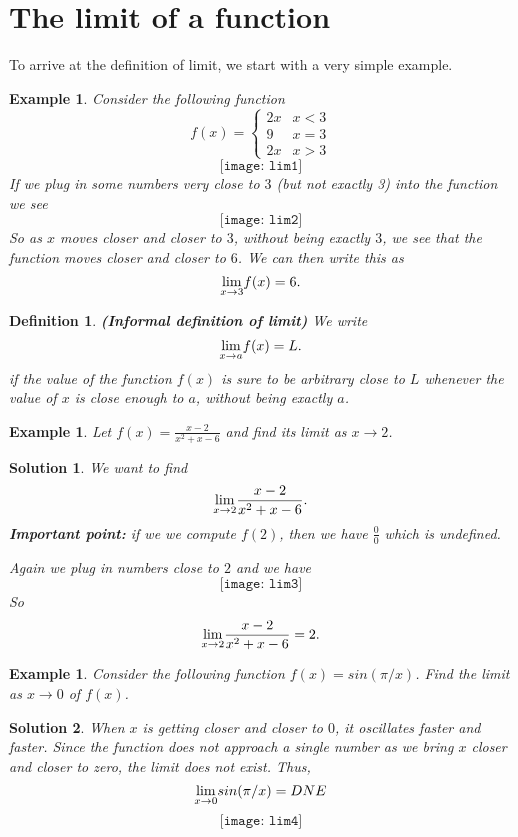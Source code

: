 \documentclass[12pt,a4paper]{book}
\newtheorem{Example}[theorem]{Example}
\numberwithin{equation}{section}
\newtheorem*{definition}{Definition}
\newtheorem*{solution}{{\bf Solution}}
\begin{document}
\newpage 
\section{The limit of a function}

To arrive at the definition of limit, we start with a very simple example.
\begin{Example}
	Consider the following function
	$$
	f(x)=\begin{cases}
	2x & x<3\\
	9 & x=3\\
	2x & x>3
	\end{cases}
	$$
	$$
	\texttt{[image: lim1]}
	$$
	If we plug in some numbers very close to $3$ (but not exactly 3) into the function we see
		$$
	\texttt{[image: lim2]}
	$$
	So as $x$ moves closer and closer to $3$, without being exactly $3$, we see that the function moves closer and closer to $6$. We can then write this as 
	$$\underset{x\rightarrow 3}{\rm lim}f(x)=6.$$ \end{Example}
	\begin{mdframed}
	\begin{definition}
		{\bf (Informal definition of limit)} We write 
		$$\underset{x\rightarrow a}{\rm lim}f(x)=L.$$
		if the value of the function $f(x)$ is sure to be arbitrary close to $L$ whenever the value of $x$ is close enough to $a$, without being exactly $a$.
	\end{definition}
	\end{mdframed}

\begin{Example}
	Let $f(x)=\frac{x-2}{x^2+x-6}$ and find its limit as $x\rightarrow 2$.  
\end{Example}
\begin{solution}
	We want to find
		$$\underset{x\rightarrow 2}{\rm lim}\frac{x-2}{x^2+x-6}.$$
		{\bf Important point:} if we we compute $f(2)$, then we have $\frac{0}{0}$ which is undefined.
		
		Again we plug in numbers close to $2$ and we have 
	$$
\texttt{[image: lim3]}
$$
		So
		$$\underset{x\rightarrow 2}{\rm lim}\frac{x-2}{x^2+x-6}=2.$$
		
\end{solution}
\begin{Example} Consider the following function $f (x) = sin(\pi/x)$. Find the limit as  $x\rightarrow 0$ of $f(x)$.
\end{Example}

\begin{solution}  When $x$ is getting closer and closer to $0$, it
oscillates faster and faster. Since the function does not approach
a single number as we bring $x$ closer and closer to zero, the limit does not exist. Thus, 
$$\underset{x\rightarrow 0}{\rm lim}sin(\pi/x)=DNE$$
		$$
	\texttt{[image: lim4]}
	$$
\end{solution}
\end{document}
